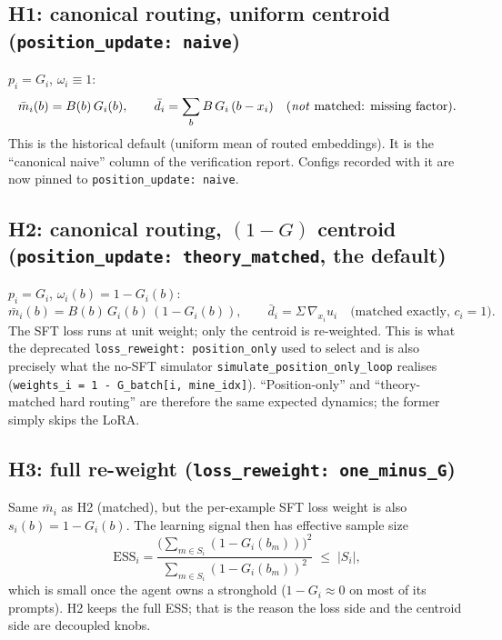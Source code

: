 \documentclass[11pt]{article}
\theoremstyle{remark}
\newcommand{\Sig}{\Sigma}
\newcommand{\cfg}[1]{\texttt{#1}}
\begin{document}
\subsection{H1: canonical routing, uniform centroid (\cfg{position\_update: naive})}
$p_i=G_i$, $\omega_i\equiv1$:
\begin{equation}
  \bar m_i(b) = B(b)\,G_i(b),\qquad
  \bar d_i = \sum_b B\,G_i\,(b-x_i)\quad\text{(\emph{not} matched: missing factor).}
\end{equation}
This is the historical default (uniform mean of routed embeddings). It is the
``canonical naive'' column of the verification report. Configs recorded with
it are now pinned to \cfg{position\_update: naive}.

\subsection{H2: canonical routing, $(1-G)$ centroid (\cfg{position\_update: theory\_matched}, the default)}
$p_i=G_i$, $\omega_i(b)=1-G_i(b)$:
\begin{equation}
  \bar m_i(b) = B(b)\,G_i(b)\,(1-G_i(b)),\qquad
  \bar d_i = \Sig\,\nabla_{x_i}u_i\quad\text{(matched exactly, $c_i=1$).}
\end{equation}
The SFT loss runs at unit weight; only the centroid is re-weighted. This is
what the deprecated \cfg{loss\_reweight: position\_only} used to select and
is also precisely what the no-SFT simulator
\texttt{simulate\_position\_only\_loop} realises
(\texttt{weights\_i = 1 - G\_batch[i, mine\_idx]}). ``Position-only'' and
``theory-matched hard routing'' are therefore the same expected dynamics; the
former simply skips the LoRA.

\subsection{H3: full re-weight (\cfg{loss\_reweight: one\_minus\_G})}
Same $\bar m_i$ as H2 (matched), but the per-example SFT loss weight is also
$s_i(b)=1-G_i(b)$. The learning signal then has effective sample size
\[
  \mathrm{ESS}_i=\frac{\big(\sum_{m\in S_i}(1-G_i(b_m))\big)^2}{\sum_{m\in S_i}(1-G_i(b_m))^2}
  \;\le\; |S_i|,
\]
which is small once the agent owns a stronghold ($1-G_i\approx0$ on most of
its prompts). H2 keeps the full ESS; that is the reason the loss side and the
centroid side are decoupled knobs.
\end{document}
